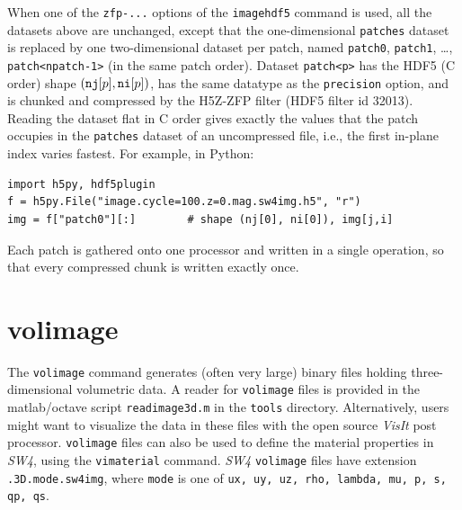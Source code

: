\documentclass[11pt]{report}
\begin{document}
{When one of the {\tt zfp-...} options of the {\tt imagehdf5} command is used, all the datasets
above are unchanged, except that the one-dimensional {\tt patches} dataset is replaced by one
two-dimensional dataset per patch, named {\tt patch0}, {\tt patch1}, \ldots, {\tt patch<npatch-1>}
(in the same patch order). Dataset {\tt patch<p>} has the HDF5 (C order) shape
$({\tt nj}[p],{\tt ni}[p])$, has the same datatype as the {\tt precision} option, and is chunked and
compressed by the H5Z-ZFP filter (HDF5 filter id 32013). Reading the dataset flat in C order gives
exactly the values that the patch occupies in the {\tt patches} dataset of an uncompressed file,
i.e., the first in-plane index varies fastest. For example, in Python:
\begin{verbatim}
import h5py, hdf5plugin
f = h5py.File("image.cycle=100.z=0.mag.sw4img.h5", "r")
img = f["patch0"][:]        # shape (nj[0], ni[0]), img[j,i]
\end{verbatim}
Each patch is gathered onto one processor and written in a single operation, so that every
compressed chunk is written exactly once.



\section{volimage}\label{sec:volimage-format}

The \verb+volimage+ command generates (often very large) binary files holding three-dimensional
volumetric data. A reader for \verb+volimage+ files is provided in the matlab/octave script
\verb+readimage3d.m+ in the \verb+tools+ directory.  Alternatively, users might want to visualize
the data in these files with the open source {\em VisIt} post processor. \verb+volimage+ files can
also be used to define the material properties in \emph{SW4}, using the \verb+vimaterial+
command. \emph{SW4} \verb+volimage+ files have extension \verb+.3D.mode.sw4img+, where \verb+mode+ is one
of \verb+ux, uy, uz, rho, lambda, mu, p, s, qp, qs+.

}
\end{document}
